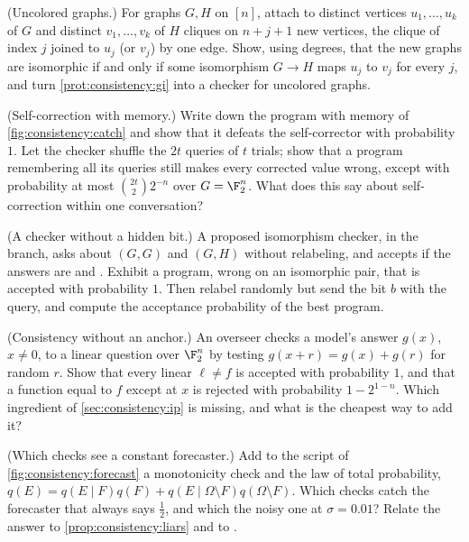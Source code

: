 \begin{refsection}
\begin{exercises}
\item \variation (Uncolored graphs.) For graphs $G,H$ on $[n]$, attach to distinct vertices $u_1,\dots,u_k$ of $G$ and distinct $v_1,\dots,v_k$ of $H$ cliques on $n+j+1$ new vertices, the clique of index $j$ joined to $u_j$ (or $v_j$) by one edge. Show, using degrees, that the new graphs are isomorphic if and only if some isomorphism $G\to H$ maps $u_j$ to $v_j$ for every $j$, and turn \cref{prot:consistency:gi} into a checker for uncolored graphs.\label{ex:consistency:gadget}

\item \attack (Self-correction with memory.) Write down the program with memory of \cref{fig:consistency:catch} and show that it defeats the self-corrector with probability $1$. Let the checker shuffle the $2t$ queries of $t$ trials; show that a program remembering all its queries still makes every corrected value wrong, except with probability at most $\binom{2t}{2}2^{-n}$ over $G=\F_2^n$. What does this say about self-correction within one conversation?\label{ex:consistency:memory}

\item \attack (A checker without a hidden bit.) A proposed isomorphism checker, in the \consistencyno{} branch, asks about $(G,G)$ and $(G,H)$ without relabeling, and accepts if the answers are \consistencyyes{} and \consistencyno. Exhibit a program, wrong on an isomorphic pair, that is accepted with probability $1$. Then relabel randomly but send the bit $b$ with the query, and compute the acceptance probability of the best program.\label{ex:consistency:nohiding}

\item \attack (Consistency without an anchor.) An overseer checks a model's answer $g(x)$, $x\ne0$, to a linear question over $\F_2^n$ by testing $g(x+r)=g(x)+g(r)$ for random $r$. Show that every linear $\ell\ne f$ is accepted with probability $1$, and that a function equal to $f$ except at $x$ is rejected with probability $1-2^{1-n}$. Which ingredient of \cref{sec:consistency:ip} is missing, and what is the cheapest way to add it?\label{ex:consistency:anchor}

\item \simulation (Which checks see a constant forecaster.) Add to the script of \cref{fig:consistency:forecast} a monotonicity check and the law of total probability, $q(E)=q(E\mid F)q(F)+q(E\mid\Omega\setminus F)q(\Omega\setminus F)$. Which checks catch the forecaster that always says $\frac12$, and which the noisy one at $\sigma=0.01$? Relate the answer to \cref{prop:consistency:liars} and to \textcite{PalekaEtAl2025}.\label{ex:consistency:constant}


\end{exercises}
\end{refsection}
